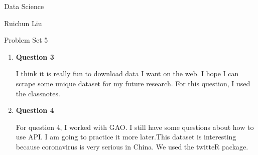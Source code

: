 \documentclass[11pt,a4paper]{article}
\begin{document}
	\begin{center}
		Data Science
		
		Ruichun Liu
		
		Problem Set 5
	\end{center}
\begin{enumerate}



    \item \textbf{Question 3}
		  \begin{description}
	            I think it is really fun to download data I want on the web. I hope I can scrape some unique dataset for my future research. For this question, I used the classnotes.      
          \end{description}
          
    \item \textbf{Question 4}
		  \begin{description}
             For question 4, I worked with GAO. I still have some questions about how to use API. I am going to practice it more later.This dataset is interesting because coronavirus is very serious in China. We used the twitteR package.                     
          \end{description}
          
\end{enumerate}
\end{document}
